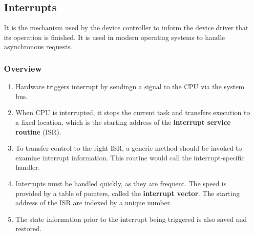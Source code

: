 \documentclass[journal,12pt,twocolumn]{IEEEtran}
\begin{document}
\subsection{Interrupts}

It is the mechanism used by the device controller to inform the device driver 
that its operation is finished. It is used in modern operating systems to 
handle asynchronous requests.

\subsubsection{Overview}
\begin{enumerate}
    \item Hardware triggers interrupt by sendingn a signal to the CPU via the 
    system bus.
    \item When CPU is interrupted, it stops the current task and transfers 
    execution to a fixed location, which is the starting address of the
    \textbf{interrupt service routine} (ISR).
    \item To transfer control to the right ISR, a generic method should be 
    invoked to examine interrupt information. This routine would call the 
    interrupt-specific handler.
    \item Interrupts must be handled quickly, as they are frequent. The speed 
    is provided by a table of pointers, called the \textbf{interrupt vector}. 
    The starting address of the ISR are indexed by a unique number.
    \item The state information prior to the interrupt being triggered is also 
    saved and restored.
\end{enumerate}
\end{document}
